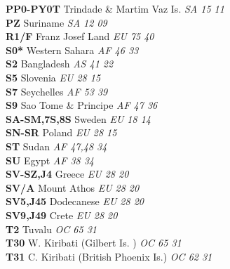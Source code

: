 ﻿\documentclass[landscape,a4paper]{article}
\begin{document}
\begin{multicols}{6}
\textbf{PP0-PY0T                } Trindade \& Martim Vaz Is.         \emph{ SA     15     11    } \\
\textbf{PZ                      } Suriname                           \emph{ SA     12     09    } \\
\textbf{R1/F                    } Franz Josef Land                   \emph{ EU     75     40    } \\
\textbf{S0*                     } Western Sahara                     \emph{ AF     46     33    } \\
\textbf{S2                      } Bangladesh                         \emph{ AS     41     22    } \\
\textbf{S5                      } Slovenia                           \emph{ EU     28     15    } \\
\textbf{S7                      } Seychelles                         \emph{ AF     53     39    } \\
\textbf{S9                      } Sao Tome \& Principe               \emph{ AF     47     36    } \\
\textbf{SA-SM,7S,8S             } Sweden                             \emph{ EU     18     14    } \\
\textbf{SN-SR                   } Poland                             \emph{ EU     28     15    } \\
\textbf{ST                      } Sudan                              \emph{ AF     47,48  34    } \\
\textbf{SU                      } Egypt                              \emph{ AF     38     34    } \\
\textbf{SV-SZ,J4                } Greece                             \emph{ EU     28     20    } \\
\textbf{SV/A                    } Mount Athos                        \emph{ EU     28     20    } \\
\textbf{SV5,J45                 } Dodecanese                         \emph{ EU     28     20    } \\
\textbf{SV9,J49                 } Crete                              \emph{ EU     28     20    } \\
\textbf{T2                      } Tuvalu                             \emph{ OC     65     31    } \\
\textbf{T30                     } W. Kiribati (Gilbert Is. )         \emph{ OC     65     31    } \\
\textbf{T31                     } C. Kiribati (British Phoenix Is.)  \emph{ OC     62     31    } \\

\end{multicols}
\end{document}
